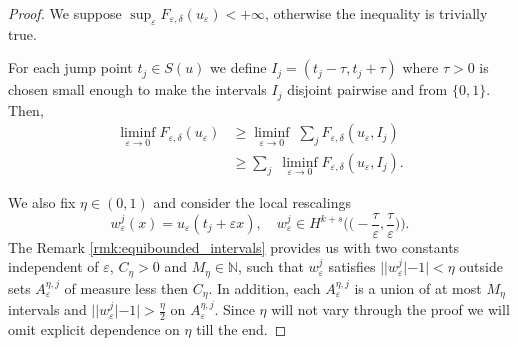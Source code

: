 \documentclass{article}
\theoremstyle{definition}
\newcommand{\N}{\mathbb{N}}
\newcommand{\e}{\varepsilon}
\newcommand{\del}{\delta}
\def\e{\varepsilon}
\begin{document}
\begin{proof}
We suppose $\sup_\e F_{\e,\delta}(u_\e) <+\infty$, otherwise the inequality is trivially true. 

     For each jump point $t_j \in S(u)$ we define $I_j = (t_j-\tau, t_j + \tau)$ where $\tau>0$ is chosen small enough to make the intervals $I_j$ disjoint pairwise and from $\{0,1\}$. Then,
   \begin{equation}\label{eq:lower_bound_localization}
       \begin{split}
           \liminf_{\e\to 0} F_{\e,\del}(u_\e) &\geq \liminf_{\e\to 0}\; \sum_j F_{\e,\del}(u_\e, I_j) \\
           &\geq \sum_j \;\liminf_{\e \to 0} F_{\e,\del}(u_\e, I_j).
       \end{split}
   \end{equation}


We also fix $\eta \in (0,1)$  and consider the local rescalings
 \begin{equation*}
     w_\e^j(x)=u_\e(t_j+\e x),\quad w_\e^j\in H^{k+s}\Big(\Big({-}\frac{\tau}{\e} ,\frac{\tau}{\e} \Big)\Big).
 \end{equation*}
The Remark \ref{rmk:equibounded_intervals} provides us with two constants independent of $\e$, $C_\eta>0$ and
 $M_\eta\in \N$, such that $w_\e^j$ satisfies $||w^j_\e|-1|<\eta$ outside sets $A^{\eta,j}_\e$ of measure less then $C_\eta$. In addition, each $A^{\eta,j}_\e$ is a union of at most $M_\eta$ intervals  and $||w^j_\e|-1\big|>\frac{\eta}{2}$ on  $A^{\eta,j}_\e$. Since $\eta$ will not vary through the proof we will omit explicit dependence on $\eta$ till the end.


\end{proof}
\end{document}
